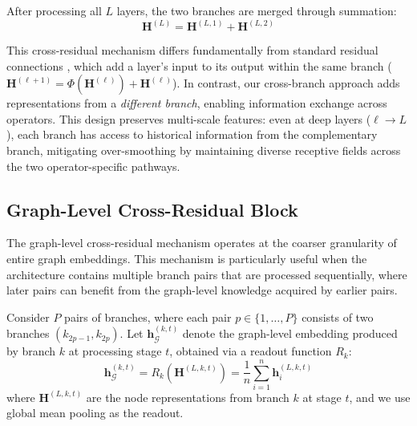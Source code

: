 After processing all $L$ layers, the two branches are merged through summation:
\begin{equation}
\mathbf{H}^{(L)} = \mathbf{H}^{(L, 1)} + \mathbf{H}^{(L, 2)}
\end{equation}

This cross-residual mechanism differs fundamentally from standard residual connections \cite{he2016deep}, which add a layer's input to its output within the same branch ($\mathbf{H}^{(\ell+1)} = \Phi(\mathbf{H}^{(\ell)}) + \mathbf{H}^{(\ell)}$). In contrast, our cross-branch approach adds representations from a \textit{different branch}, enabling information exchange across operators. This design preserves multi-scale features: even at deep layers ($\ell \to L$), each branch has access to historical information from the complementary branch, mitigating over-smoothing by maintaining diverse receptive fields across the two operator-specific pathways.

\subsection{Graph-Level Cross-Residual Block}

The graph-level cross-residual mechanism operates at the coarser granularity of entire graph embeddings. This mechanism is particularly useful when the architecture contains multiple branch pairs that are processed sequentially, where later pairs can benefit from the graph-level knowledge acquired by earlier pairs.

Consider $P$ pairs of branches, where each pair $p \in \{1, \ldots, P\}$ consists of two branches $(k_{2p-1}, k_{2p})$. Let $\mathbf{h}_{\mathcal{G}}^{(k, t)}$ denote the graph-level embedding produced by branch $k$ at processing stage $t$, obtained via a readout function $R_k$:
\begin{equation}
\mathbf{h}_{\mathcal{G}}^{(k, t)} = R_k\left(\mathbf{H}^{(L, k, t)}\right) = \frac{1}{n}\sum_{i=1}^{n} \mathbf{h}_i^{(L, k, t)}
\end{equation}
where $\mathbf{H}^{(L, k, t)}$ are the node representations from branch $k$ at stage $t$, and we use global mean pooling as the readout.


